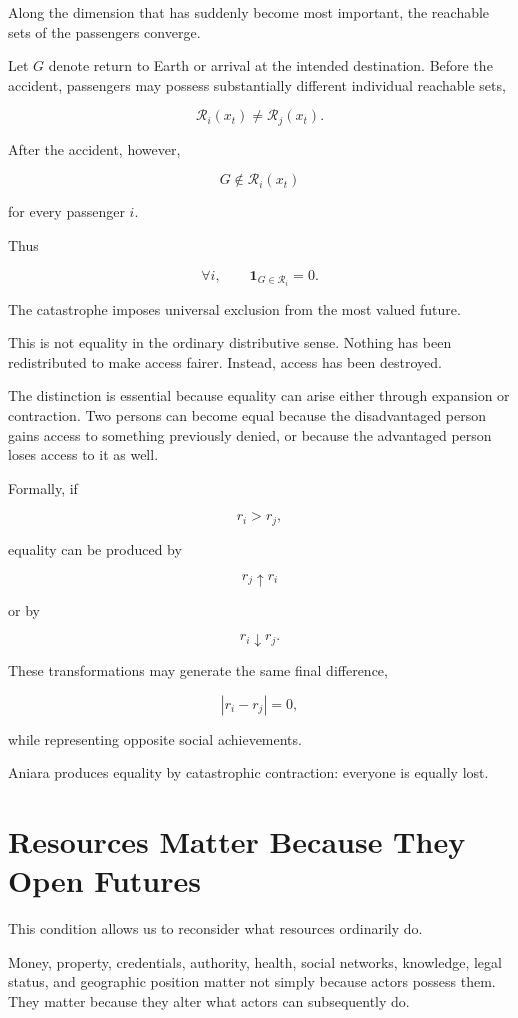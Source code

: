 \documentclass[11pt,oneside]{book}
\theoremstyle{definition}
\theoremstyle{remark}
\newcommand{\R}{\mathcal{R}}
\begin{document}
Along the dimension that has suddenly become most important, the reachable sets of the passengers converge.

Let \(G\) denote return to Earth or arrival at the intended destination. Before the accident, passengers may possess substantially different individual reachable sets,

\[
\R_i(x_t)\neq\R_j(x_t).
\]

After the accident, however,

\[
G\notin\R_i(x_t)
\]

for every passenger \(i\).

Thus

\[
\forall i,\qquad
\mathbf{1}_{G\in\R_i}=0.
\]

The catastrophe imposes universal exclusion from the most valued future.

This is not equality in the ordinary distributive sense. Nothing has been redistributed to make access fairer. Instead, access has been destroyed.

The distinction is essential because equality can arise either through expansion or contraction. Two persons can become equal because the disadvantaged person gains access to something previously denied, or because the advantaged person loses access to it as well.

Formally, if

\[
r_i>r_j,
\]

equality can be produced by

\[
r_j\uparrow r_i
\]

or by

\[
r_i\downarrow r_j.
\]

These transformations may generate the same final difference,

\[
|r_i-r_j|=0,
\]

while representing opposite social achievements.

Aniara produces equality by catastrophic contraction: everyone is equally lost.

\section{Resources Matter Because They Open Futures}

This condition allows us to reconsider what resources ordinarily do.

Money, property, credentials, authority, health, social networks, knowledge, legal status, and geographic position matter not simply because actors possess them. They matter because they alter what actors can subsequently do.
\end{document}
